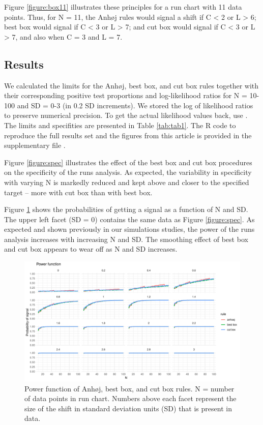 Figure \ref{figure:box11} illustrates these principles for a run chart
with 11 data points. Thus, for N = 11, the Anhøj rules would signal a
shift if C \textless{} 2 or L \textgreater{} 6; best box would signal if
C \textless{} 3 or L \textgreater{} 7; and cut box would signal if C
\textless{} 3 or L \textgreater{} 7, and also when C = 3 and L = 7.

\hypertarget{results}{%
\subsection{Results}\label{results}}

We calculated the limits for the Anhøj, best box, and cut box rules
together with their corresponding positive test proportions and
log-likelihood ratios for N = 10-100 and SD = 0-3 (in 0.2 SD
increments). We stored the log of likelihood ratios to preserve
numerical precision. To get the actual likelihood values back, use
. The limits and specifities are presented in
Table \ref{tab:tab1}. The R code to reproduce the full results set and
the figures from this article is provided in the supplementary file
.

Figure \ref{figure:spec} illustrates the effect of the best box and cut
box procedures on the specificity of the runs analysis. As expected, the
variability in specificity with varying N is markedly reduced and kept
above and closer to the specified target -- more with cut box than with
best box.

Figure \ref{figure:pwr} shows the probabilities of getting a signal as a
function of N and SD. The upper left facet (SD = 0) contains the same
data as Figure \ref{figure:spec}. As expected and shown previously in
our simulations studies, the power of the runs analysis increases with
increasing N and SD. The smoothing effect of best box and cut box
appears to wear off as N and SD increases.

\begin{figure}[htbp]
  \centering
  \includegraphics[width=\textwidth]{fig_pwr.pdf}
  \caption{Power function of Anhøj, best box, and cut box rules.
           N = number of data points in run chart.
           Numbers above each facet represent the size of the shift in standard
           deviation units (SD) that is present in data.}
  \label{figure:pwr}
\end{figure}

